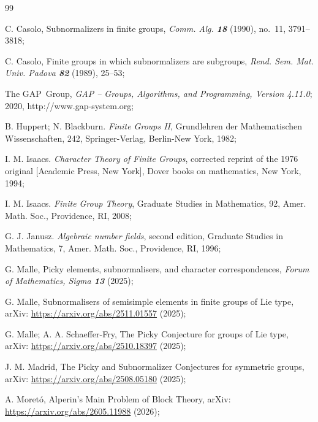 \documentclass[12pt]{amsart}
\theoremstyle{remark}
\theoremstyle{definition}
\theoremstyle{plain}
\theoremstyle{definition}
\numberwithin{equation}{section}
\begin{document}
\begin{thebibliography}{99}
	
	{\sc C. Casolo}, Subnormalizers in finite groups, \emph{Comm. Alg. {\bf 18}} (1990), no.~11, 3791--3818;
	
	{\sc C. Casolo}, Finite groups in which subnormalizers are subgroups, \emph{Rend. Sem. Mat. Univ. Padova {\bf 82}} (1989), 25--53;
	
	{\sc The GAP~Group}, \emph{GAP -- Groups, Algorithms, and Programming, Version
		4.11.0}; 2020, {\sf http://www.gap-system.org};
		
	{\sc B. Huppert; N. Blackburn}. \emph{Finite Groups II}, Grundlehren der Mathematischen Wissenschaften, 242, Springer-Verlag, Berlin-New York, 1982;
	
	{\sc I. M. Isaacs}. \emph{Character Theory of Finite Groups}, corrected reprint of the 1976 original [Academic Press, New York], Dover books on mathematics, New York, 1994;
	
	{\sc I. M. Isaacs}. \emph{Finite Group Theory}, Graduate Studies in Mathematics, 92, Amer. Math. Soc., Providence, RI, 2008;
	
	{\sc G. J. Janusz}. \emph{Algebraic number fields}, second edition, 
	Graduate Studies in Mathematics, 7, Amer. Math. Soc., Providence, RI, 1996;
	
	{\sc G. Malle}, Picky elements, subnormalisers, and character correspondences, \emph{Forum of Mathematics, Sigma {\bf 13}} (2025);
	
	{\sc G. Malle}, Subnormalisers of semisimple elements in finite groups of Lie type, arXiv: \url{https://arxiv.org/abs/2511.01557} (2025);
	
	{\sc G. Malle; A. A. Schaeffer-Fry}, The Picky Conjecture for groups of Lie type, arXiv: \url{https://arxiv.org/abs/2510.18397} (2025);
	
	{\sc J. M. Madrid}, The Picky and Subnormalizer Conjectures for symmetric groups, arXiv: \url{https://arxiv.org/abs/2508.05180} (2025);
	
	{\sc A. Moretó}, Alperin's Main Problem of Block Theory, arXiv: \url{https://arxiv.org/abs/2605.11988} (2026);
	

\end{thebibliography}
\end{document}
